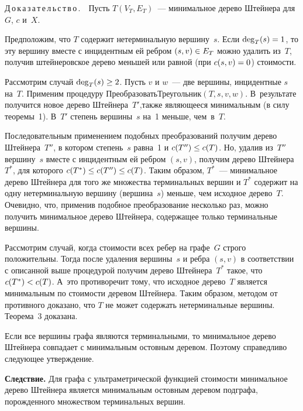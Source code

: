 \begin{multicols}{2}
\smallskip

\noindent
Д\,о\,к\,а\,з\,а\,т\,е\,л\,ь\,с\,т\,в\,о\,.\ \
Пусть $T(V_T,E_T)$~--- минимальное дерево Штейнера для $G$, $c$ и~$X$.

Предположим, что $T$ содержит нетерминальную вершину~$s$.
Если $\mathrm{deg}_T(s) \hm= 1$, то эту вершину вместе с инцидентным ей ребром
$(s,v) \hm\in E_T$ можно удалить из~$T$,
получив штейнеровское дерево меньшей или равной (при $c(s,v)\hm=0$) стоимости.

Рассмотрим случай $\mathrm{deg}_T(s) \hm\geq 2$. Пусть $v$ и $w$~---
две вершины, инцидентные $s$ на~$T$.
Применим процедуру {\sf Пре\-об\-ра\-зо\-вать\-Тре\-у\-голь\-ник}$(T,s,v,w)$. %
В~ре\-зультате получится новое дерево Штейнера~$T'$,\linebreak также являющееся минимальным
(в силу теоремы~1). В~$T'$ степень вершины~$s$ на~1 меньше, чем~в~$T$.

Последовательным применением подобных преобразований получим дерево Штейнера~$T''$,
в котором степень~$s$ равна~1 и $c(T'') \hm\leq c(T)$. Но, удалив из~$T''$ вершину~$s$ вместе с
инцидентным ей ребром $(s,v)$, получим дерево Штейнера~$T^*$, для которого
$c(T^*) \hm\leq c(T'') \hm\leq c(T)$. Таким образом, $T^*$~---
минимальное дерево Штейнера для того же
множества терминальных вершин и $T^*$ содержит
на одну нетерминальную вершину (вершина~$s$) меньше,
чем  исходное дерево~$T$. Очевидно, что, применив подобное преобразование несколько раз,
можно получить минимальное дерево Штейнера, содержащее только терминальные вершины.

Рассмотрим случай, когда стоимости всех ребер на графе~$G$ строго положительны.
Тогда после удаления вершины~$s$ и ребра $(s,v)$ в соответствии с описанной выше процедурой
получим дерево Штейнера~$T^*$ такое, что $c(T^*) \hm< c(T)$.
А~это противоречит тому, что исходное дерево~$T$ является минимальным по стоимости деревом Штейнера.
Таким образом, методом от противного доказано, что $T$ не может содержать нетерминальные вершины.
Теорема~3 доказана.


\smallskip

Если все вершины графа являются терминальными, то минимальное дерево Штейнера
совпадает с
минимальным остовным деревом. Поэтому справедливо следующее утверждение.


\smallskip

\noindent
\textbf{Следствие.} Для графа с ультраметрической функцией стоимости
минимальное дерево Штейнера
является минимальным остовным деревом подграфа, порожденного множеством терминальных вершин.


\end{multicols}
